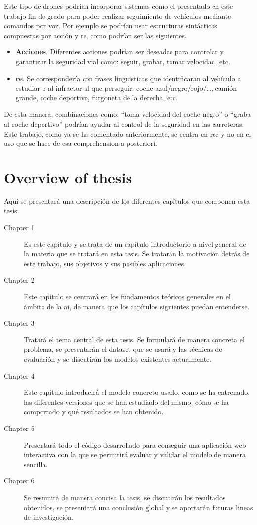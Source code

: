 Este tipo de drones podrían incorporar sistemas como el presentado en este
trabajo fin de grado para poder realizar seguimiento de vehículos mediante
comandos por voz. Por ejemplo se podrían usar estructuras sintácticas
compuestas por acción y \gls{re}, como podrían ser las siguientes.

\begin{itemize}
  \item \textbf{Acciones}. Diferentes acciones podrían ser deseadas para
  controlar y garantizar la seguridad vial como: seguir, grabar, tomar
  velocidad, etc.
  \item \textbf{\gls*{re}}. Se correspondería con frases linguisticas que
  identificaran al vehículo a estudiar o al infractor al que perseguir: coche
  azul/negro/rojo/\ldots, camión grande, coche deportivo, furgoneta de la
  derecha, etc.
\end{itemize}

De esta manera, combinaciones como: ``toma velocidad del coche negro'' o
``graba al coche deportivo'' podrían ayudar al control de la seguridad en las
carreteras. Este trabajo, como ya se ha comentado anteriormente, se centra en
\gls{rec} y no en el uso que se hace de esa comprehension a posteriori.


\section{Overview of thesis}

Aquí se presentará una descripción de los diferentes capítulos que componen
esta tesis.

\begin{description}
  \item[Chapter 1] Es este capítulo y se trata de un capítulo introductorio a
  nivel general de la materia que se tratará en esta tesis. Se tratarán la
  motivación detrás de este trabajo, sus objetivos y sus posibles
  aplicaciones. 
  \item[Chapter 2] Este capítulo se centrará en los fundamentos teóricos
  generales en el ámbito de la \gls{ai}, de manera que los capítulos siguientes
  puedan entenderse. 
  \item[Chapter 3] Tratará el tema central de esta tesis. Se formulará de
  manera concreta el problema, se presentarán el dataset que se usará y las
  técnicas de evaluación y se discutirán los modelos existentes
  actualmente. 
  \item[Chapter 4] Este capítulo introducirá el modelo concreto usado, como se
  ha entrenado, las diferentes versiones que se han estudiado del mismo, cómo
  se ha comportado y qué resultados se han obtenido. 
  \item[Chapter 5] Presentará todo el código desarrollado para conseguir una
  aplicación web interactiva con la que se permitirá evaluar y validar el
  modelo de manera sencilla. 
  \item[Chapter 6] Se resumirá de manera concisa la tesis, se discutirán los
  resultados obtenidos, se presentará una conclusión global y se aportarán
  futuras lineas de investigación. 
\end{description}

